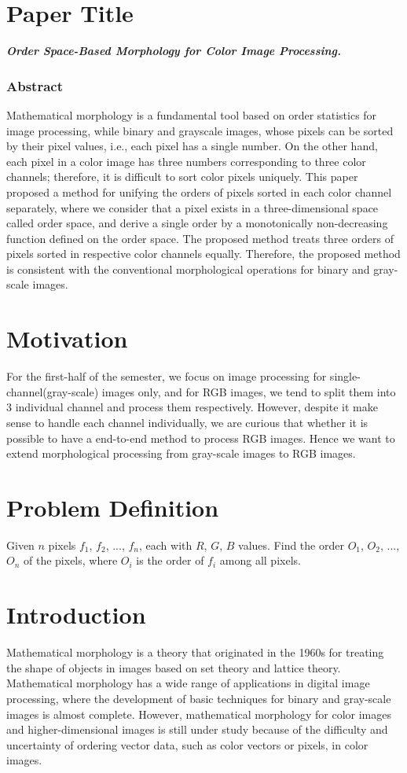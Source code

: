 \section*{Paper Title}
\textbf{\textit{Order Space-Based Morphology for Color Image Processing.}}


\subsubsection*{Abstract}
Mathematical morphology is a fundamental tool based on order statistics for image processing, while binary and grayscale images, whose pixels can be sorted by their pixel values, i.e., each pixel has a single number. On the other hand, each pixel in a color image has three numbers corresponding to three color channels; therefore, it is difficult to sort color pixels uniquely. This paper proposed a method for unifying the orders of pixels sorted in each color channel separately, where we consider that a pixel exists in a three-dimensional space called order space, and derive a single order by a monotonically non-decreasing function defined on the order space. The proposed method treats three orders of pixels sorted in respective color channels equally. Therefore, the proposed method is consistent with the conventional morphological operations for binary and gray-scale images.

\section*{Motivation}
For the first-half of the semester, we focus on image processing for single-channel(gray-scale) images only, and for RGB images, we tend to split them into 3 individual channel and process them respectively. However, despite it make sense to handle each channel individually, we are curious that whether it is possible to have a end-to-end method to process RGB images. Hence we want to extend morphological processing from gray-scale images to RGB images.

\section*{Problem Definition}
Given $n$ pixels $f_1$, $f_2$, ..., $f_n$, each with $R$, $G$, $B$ values. Find the order $O_1$, $O_2$, ..., $O_n$ of the pixels, where $O_i$ is the order of $f_i$ among all pixels.



\section*{Introduction}
Mathematical morphology is a theory that originated in the 1960s for treating the shape of objects in images based on set theory and lattice theory. Mathematical morphology has a wide range of applications in digital image processing, where the development of basic techniques for binary and gray-scale images is almost complete. However, mathematical morphology for color images and higher-dimensional images is still under study because of the difficulty and uncertainty of ordering vector data, such as color vectors or pixels, in color images.\\

